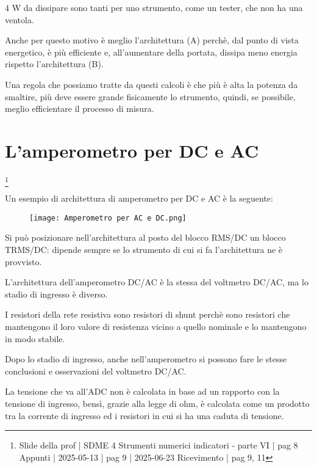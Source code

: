 4 W da dissipare sono tanti per uno strumento, come un tester, che non ha una ventola. \newline 

Anche per questo motivo è meglio l'architettura (A) perchè, dal punto di vista energetico, è più efficiente e, all'aumentare della portata, 
dissipa meno energia rispetto l'architettura (B). \newline 

Una regola che possiamo tratte da questi calcoli è che 
più è alta la potenza da smaltire, 
più deve essere grande fisicamente lo strumento, quindi, se possibile, meglio efficientare il processo di misura. \newline 

\newpage 

\section{L'amperometro per DC e AC}
\footnote{Slide della prof | SDME 4 Strumenti numerici indicatori - parte VI | pag 8 \\  
Appunti | 2025-05-13 | pag 9 | 2025-06-23 Ricevimento | pag 9, 11}

Un esempio di architettura di amperometro per DC e AC è la seguente: 

\begin{figure}[h]
    \centering
    \texttt{[image: Amperometro per AC e DC.png]}
\end{figure}

Si può posizionare nell'architettura al posto del blocco RMS/DC un blocco TRMS/DC: 
dipende sempre se lo strumento di cui si fa l'architettura ne è provvisto. \newline 

L'architettura dell'amperometro DC/AC è la stessa del voltmetro DC/AC, 
ma lo stadio di ingresso è diverso. \newline 

I resistori della rete resistiva sono resistori di shunt perchè sono resistori che mantengono il loro valore di resistenza vicino a quello nominale e lo mantengono in modo stabile. \newline

Dopo lo stadio di ingresso, anche nell'amperometro si possono fare le stesse conclusioni e osservazioni del voltmetro DC/AC. \newline 

La tensione che va all'ADC non è calcolata in base ad un rapporto con la tensione di ingresso, 
bensì, grazie alla legge di ohm, è calcolata come un prodotto tra la corrente di ingresso ed i resistori in cui si ha una caduta di tensione. \newline 

